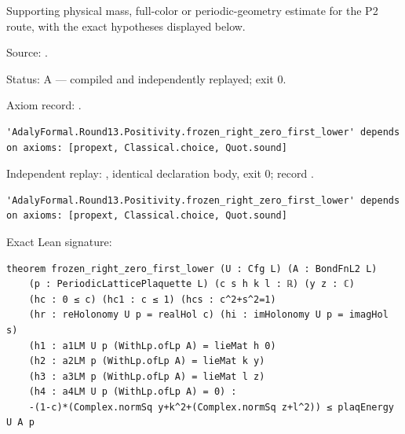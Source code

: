 \begin{theorem}[bp-467]
\label{bp-467}
\leanok
Supporting physical mass, full-color or periodic-geometry estimate for the P2 route, with the exact hypotheses displayed below.

\par Source: \texttt{}.
\par Status: A — compiled and independently replayed; exit 0.
\par Axiom record: \texttt{}.
\begin{verbatim}
'AdalyFormal.Round13.Positivity.frozen_right_zero_first_lower' depends on axioms: [propext, Classical.choice, Quot.sound]
\end{verbatim}
\par Independent replay: \texttt{}, identical declaration body, exit 0; record \texttt{}.
\begin{verbatim}
'AdalyFormal.Round13.Positivity.frozen_right_zero_first_lower' depends on axioms: [propext, Classical.choice, Quot.sound]
\end{verbatim}
\par Exact Lean signature:
\begin{verbatim}
theorem frozen_right_zero_first_lower (U : Cfg L) (A : BondFnL2 L)
    (p : PeriodicLatticePlaquette L) (c s h k l : ℝ) (y z : ℂ)
    (hc : 0 ≤ c) (hc1 : c ≤ 1) (hcs : c^2+s^2=1)
    (hr : reHolonomy U p = realHol c) (hi : imHolonomy U p = imagHol s)
    (h1 : a1LM U p (WithLp.ofLp A) = lieMat h 0)
    (h2 : a2LM p (WithLp.ofLp A) = lieMat k y)
    (h3 : a3LM p (WithLp.ofLp A) = lieMat l z)
    (h4 : a4LM U p (WithLp.ofLp A) = 0) :
    -(1-c)*(Complex.normSq y+k^2+(Complex.normSq z+l^2)) ≤ plaqEnergy U A p
\end{verbatim}
\end{theorem}

